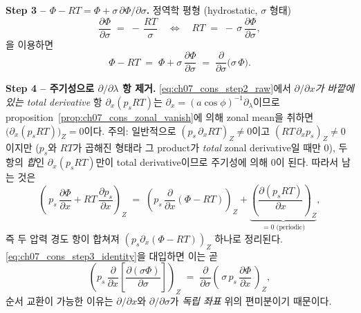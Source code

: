 \medskip



\noindent\textbf{Step 3 -- $\Phi - RT = \Phi + \sigma\,\partial\Phi/\partial\sigma$.}
정역학 평형 (hydrostatic, $\sigma$ 형태)
\[
  \frac{\partial \Phi}{\partial \sigma}
  \;=\;
  -\,\frac{RT}{\sigma}
  \quad\Longleftrightarrow\quad
  RT \;=\; -\,\sigma\,\frac{\partial \Phi}{\partial \sigma},
\]
을 이용하면
\begin{equation}\label{eq:ch07_cons_step3_identity}
  \Phi - RT
  \;=\;
  \Phi + \sigma\,\frac{\partial \Phi}{\partial \sigma}
  \;=\;
  \frac{\partial}{\partial\sigma}\!\bigl(\sigma\,\Phi\bigr).
\end{equation}


\medskip



\noindent\textbf{Step 4 -- 주기성으로 $\partial/\partial\lambda$ 항 제거.}
\eqref{eq:ch07_cons_step2_raw}에서 \emph{$\partial/\partial x$가 바깥에 있는
total derivative} 항 $\partial_x(p_s RT)$는 $\partial_x =
(a\cos\phi)^{-1}\partial_\lambda$이므로
proposition~\ref{prop:ch07_cons_zonal_vanish}에 의해 zonal mean을 취하면
$\bigl(\partial_x(p_s RT)\bigr)_Z = 0$이다.  주의: 일반적으로
$(p_s\,\partial_x RT)_Z \neq 0$이고 $(RT\,\partial_x p_s)_Z \neq 0$이지만
($p_s$와 $RT$가 곱해진 형태라 그 product가 \emph{total} zonal derivative일
때만 0), 두 항의 \emph{합}인 $\partial_x(p_s RT)$만이 total derivative이므로
주기성에 의해 0이 된다.  따라서 남는 것은
\begin{equation}\label{eq:ch07_cons_step4_pgrad}
  \left(\,p_s\,\frac{\partial\Phi}{\partial x}
  + RT\,\frac{\partial p_s}{\partial x}\right)_{\!Z}
  \;=\;
  \left(p_s\,\frac{\partial}{\partial x}(\Phi-RT)\right)_{\!Z}
  + \underbrace{\left(\frac{\partial(p_s RT)}{\partial x}\right)_{\!Z}}_{=0 \text{ (periodic)}},
\end{equation}
즉 두 압력 경도 항이 합쳐져 \emph{$(p_s\partial_x(\Phi-RT))_Z$} 하나로 정리된다.
\eqref{eq:ch07_cons_step3_identity}을 대입하면 이는 곧
\[
  \left(p_s\,\frac{\partial}{\partial x}\!\left[\frac{\partial(\sigma\Phi)}{\partial\sigma}\right]\right)_{\!Z}
  \;=\;
  \frac{\partial}{\partial\sigma}\!\left(\,\sigma\,p_s\,\frac{\partial\Phi}{\partial x}\,\right)_{\!Z},
\]
순서 교환이 가능한 이유는 $\partial/\partial x$와 $\partial/\partial\sigma$가
\emph{독립 좌표} 위의 편미분이기 때문이다.


